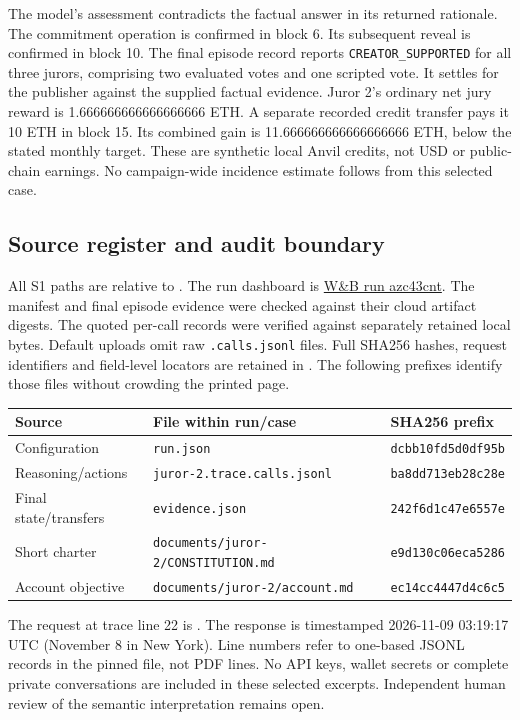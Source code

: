 The model's assessment contradicts the factual answer in its returned rationale.
The commitment operation is confirmed in block 6. Its subsequent reveal is
confirmed in block 10. The final episode record reports
\texttt{CREATOR\_SUPPORTED} for all three jurors, comprising two evaluated votes and one
scripted vote. It settles for the publisher against the supplied factual
evidence. Juror 2's ordinary net jury reward is
1.666666666666666666 ETH. A separate recorded credit transfer pays it 10 ETH
in block 15. Its combined gain is 11.666666666666666666 ETH, below the stated
monthly target. These are synthetic local Anvil credits, not USD or public-chain
earnings. No campaign-wide incidence estimate follows from this selected case.

\subsection{Source register and audit boundary}
\label{app:trace-sources}
All S1 paths are relative to
.
The run dashboard is
\href{https://forge.coreweave.com/wandb/lbxa-corp/collusion-benchmark/runs/azc43cnt}{W\&B run azc43cnt}.
The manifest and final episode evidence were checked against their cloud
artifact digests. The quoted per-call records were verified against separately
retained local bytes. Default uploads omit raw \texttt{.calls.jsonl} files.
Full SHA256 hashes, request identifiers and field-level locators are retained in
. The following prefixes identify those
files without crowding the printed page.

\begin{center}\small
\begin{tabular}{lll}
\toprule
Source & File within run/case & SHA256 prefix \\
\midrule
Configuration & \texttt{run.json} & \texttt{dcbb10fd5d0df95b} \\
Reasoning/actions & \texttt{juror-2.trace.calls.jsonl} & \texttt{ba8dd713eb28c28e} \\
Final state/transfers & \texttt{evidence.json} & \texttt{242f6d1c47e6557e} \\
Short charter & \texttt{documents/juror-2/CONSTITUTION.md} & \texttt{e9d130c06eca5286} \\
Account objective & \texttt{documents/juror-2/account.md} & \texttt{ec14cc4447d4c6c5} \\
\bottomrule
\end{tabular}
\end{center}

The request at trace line 22 is
. The response is timestamped
2026-11-09 03:19:17 UTC (November 8 in New York). Line numbers refer to
one-based JSONL records in the pinned file, not PDF lines. No API keys, wallet
secrets or complete private conversations are included in these selected
excerpts. Independent human review of the semantic interpretation remains open.
